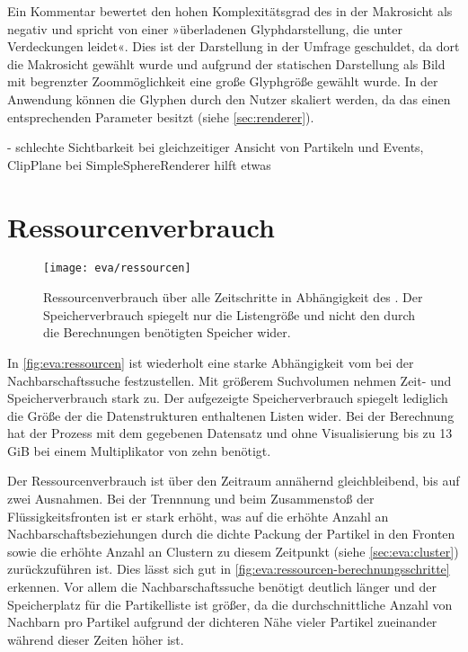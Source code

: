 Ein Kommentar bewertet den hohen Komplexitätsgrad des  in der Makrosicht als negativ und spricht von einer »überladenen Glyphdarstellung, die unter Verdeckungen leidet«. Dies ist der Darstellung in der Umfrage geschuldet, da dort die Makrosicht gewählt wurde und aufgrund der statischen Darstellung als Bild mit begrenzter Zoommöglichkeit eine große Glyphgröße gewählt wurde. In der Anwendung können die Glyphen durch den Nutzer skaliert werden, da das  einen entsprechenden Parameter besitzt (siehe \autoref{sec:renderer}).

- schlechte Sichtbarkeit bei gleichzeitiger Ansicht von Partikeln und Events, ClipPlane bei SimpleSphereRenderer hilft etwas %




\section{Ressourcenverbrauch}\label{sec:eva:ressourcen}
\begin{figure}
	\texttt{[image: eva/ressourcen]}
	\caption{Ressourcenverbrauch über alle Zeitschritte in Abhängigkeit des . Der Speicherverbrauch spiegelt nur die Listengröße und nicht den durch die Berechnungen benötigten Speicher wider.}\label{fig:eva:ressourcen}
\end{figure}

In \autoref{fig:eva:ressourcen} ist wiederholt eine starke Abhängigkeit vom  bei der Nachbarschaftssuche festzustellen. Mit größerem Suchvolumen nehmen Zeit- und Speicherverbrauch stark zu. Der aufgezeigte Speicherverbrauch spiegelt lediglich die Größe der die Datenstrukturen enthaltenen Listen wider. Bei der Berechnung hat der Prozess mit dem gegebenen Datensatz und ohne Visualisierung bis zu 13 \gls{GiB} bei einem Multiplikator von zehn benötigt.

Der Ressourcenverbrauch ist über den Zeitraum annähernd gleichbleibend, bis auf zwei Ausnahmen. Bei der Trennnung und beim Zusammenstoß der Flüssigkeitsfronten ist er stark erhöht, was auf die erhöhte Anzahl an Nachbarschaftsbeziehungen durch die dichte Packung der Partikel in den Fronten sowie die erhöhte Anzahl an Clustern zu diesem Zeitpunkt (siehe \autoref{sec:eva:cluster}) zurückzuführen ist. Dies lässt sich gut in \autoref{fig:eva:ressourcen-berechnungsschritte} erkennen. Vor allem die Nachbarschaftssuche benötigt deutlich länger und der Speicherplatz für die Partikelliste ist größer, da die durchschnittliche Anzahl von Nachbarn pro Partikel aufgrund der dichteren Nähe vieler Partikel zueinander während dieser Zeiten höher ist.

